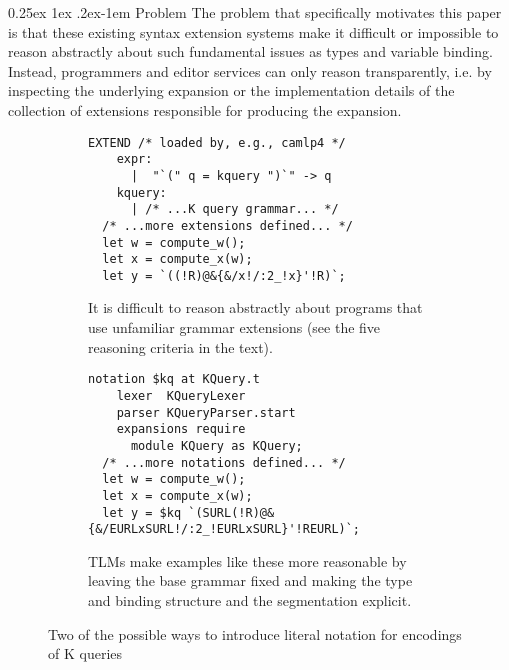 \documentclass[acmsmall,review,anonymous]{acmart}\settopmatter{printfolios=true,printccs=false,printacmref=false}
\makeatletter
\renewcommand{\paragraph}{%
  \@startsection{paragraph}{4}%
  {\z@}{0.25ex \@plus 1ex \@minus .2ex}{-1em}%
  {\normalfont\normalsize\bfseries}%
}
\makeatother
\begin{document}
\paragraph{Problem} The problem that specifically motivates this paper is that these existing syntax extension systems  make it difficult or impossible to reason abstractly about such fundamental issues as types and variable binding. Instead, programmers and editor services can only reason transparently, i.e. by inspecting the underlying expansion or the implementation details of the collection of extensions responsible for producing the expansion.%
\begin{figure}[t!]
\begin{subfigure}[t]{0.48\textwidth}
\vspace{-12px}
\begin{lstlisting}[xleftmargin=-2pt, morekeywords={EXTEND}]
  EXTEND /* loaded by, e.g., camlp4 */
    expr:
      |  "`(" q = kquery ")`" -> q
    kquery: 
      | /* ...K query grammar... */
  /* ...more extensions defined... */
  let w = compute_w();
  let x = compute_x(w);
  let y = `((!R)@&{&/x!/:2_!x}'!R)`;
\end{lstlisting}
\vspace{-5px}
\caption{It is difficult to reason abstractly about programs that use unfamiliar grammar extensions (see the five reasoning criteria in the text).}
\label{fig:K-dialect}
\end{subfigure}
\hfill
\begin{subfigure}[t]{0.51\textwidth}
\vspace{-12px}
\begin{lstlisting}[xleftmargin=-2pt]
  notation $kq at KQuery.t 
    lexer  KQueryLexer
    parser KQueryParser.start
    expansions require
      module KQuery as KQuery;
  /* ...more notations defined... */
  let w = compute_w();
  let x = compute_x(w);
  let y = $kq `(SURL(!R)@&{&/EURLxSURL!/:2_!EURLxSURL}'!REURL)`;
\end{lstlisting}
\vspace{-5px}
\caption{TLMs make examples like these more reasonable by leaving the base grammar fixed and making the type and binding structure and the segmentation explicit.}
\label{fig:K-tsm-example}
\end{subfigure}
\caption{Two of the possible ways to introduce literal notation for encodings of K queries}
\vspace{-10px}
\end{figure}
\end{document}
